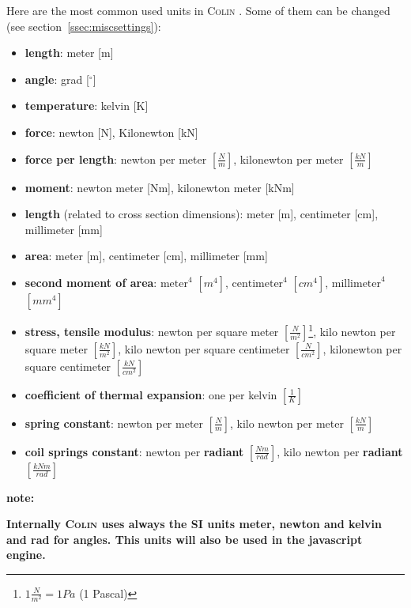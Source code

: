 \documentclass[a4paper,11pt]{report}
\newcommand{\Colin}[0]{\textsc{Colin }}
\begin{document}
Here are the most common used units in \Colin. Some of them can be changed (see section~\ref{ssec:miscsettings}):
\begin{itemize}
	\item [] \textbf{length}: meter [m]
	\item [] \textbf{angle}: grad [$^\circ$]
	\item [] \textbf{temperature}: kelvin [K]
	\item [] \textbf{force}: newton [N], Kilonewton [kN]
	\item [] \textbf{force per length}: newton per meter $\left[\frac{N}{m}\right]$, kilonewton per meter $\left[\frac{kN}{m}\right]$
	\item [] \textbf{moment}: newton meter [Nm], kilonewton meter [kNm]
	\item [] \textbf{length} (related to cross section dimensions): meter [m], centimeter [cm], millimeter [mm]
	\item [] \textbf{area}: meter [m], centimeter [cm], millimeter [mm]
	\item [] \textbf{second moment of area}: $\text{meter}^4$ $\left[m^4\right]$, $\text{centimeter}^4$ $\left[cm^4\right]$, $\text{millimeter}^4$ $\left[mm^4\right]$
	\item [] \textbf{stress, tensile modulus}: newton per square meter $\left[\frac{N}{m^2}\right]$\footnote{$1\frac{N}{m^2} = 1 Pa $ (1 Pascal)}, kilo newton per square meter $\left[\frac{kN}{m^2}\right]$, kilo newton per square centimeter $\left[\frac{N}{cm^2}\right]$, kilonewton per square centimeter $\left[\frac{kN}{cm^2}\right]$
	\item [] \textbf{coefficient of thermal expansion}: one per kelvin $\left[\frac{1}{K}\right]$
	\item [] \textbf{spring constant}: newton per meter $\left[\frac{N}{m}\right]$, kilo newton per meter $\left[\frac{kN}{m}\right]$
	\item [] \textbf{coil springs constant}: newton per \textbf{radiant} $\left[\frac{Nm}{rad}\right]$, kilo newton per \textbf{radiant} $\left[\frac{kNm}{rad}\right]$
	
\end{itemize}


\textbf{note:}
\begin{center}
\textbf{Internally \Colin uses always the SI units meter, newton and kelvin and rad for angles. This units will also be used in the javascript engine.}
\end{center}
\end{document}
